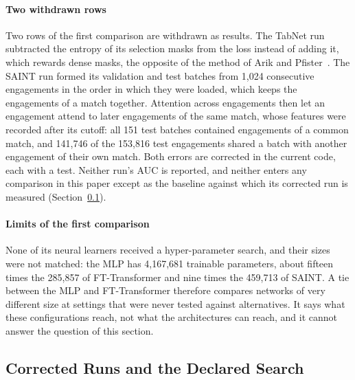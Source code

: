\paragraph{Two withdrawn rows}
Two rows of the first comparison are withdrawn as results. The TabNet run subtracted the entropy of its
selection masks from the loss instead of adding it, which rewards dense masks, the opposite of the method
of Arik and Pfister~\cite{arik2021tabnet}. The SAINT run formed its validation and test batches from
1,024 consecutive engagements in the order in which they were loaded, which keeps the engagements of a
match together. Attention across engagements then let an engagement attend to later engagements of the
same match, whose features were recorded after its cutoff: all 151 test batches contained engagements of
a common match, and 141,746 of the 153,816 test engagements shared a batch with another engagement of their
own match. Both errors are corrected in the current code, each with a test. Neither run's AUC is reported,
and neither enters any comparison in this paper except as the baseline against which its corrected run is
measured (Section~\ref{sec:learners-effort}).

\paragraph{Limits of the first comparison}
None of its neural learners received a hyper-parameter search, and their sizes were not matched: the MLP
has 4,167,681 trainable parameters, about fifteen times the 285,857 of FT-Transformer and nine times the
459,713 of SAINT. A tie between the MLP and FT-Transformer therefore compares networks of very different
size at settings that were never tested against alternatives. It says what these configurations reach,
not what the architectures can reach, and it cannot answer the question of this section.

\subsection{Corrected Runs and the Declared Search}
\label{sec:learners-effort}

